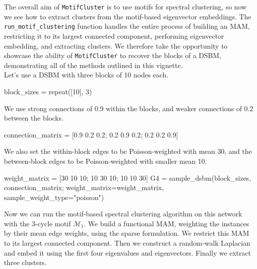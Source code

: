 \documentclass{article}
\begin{document}
The overall aim of \texttt{MotifCluster} is to use motifs for spectral clustering,
so now we see how to extract clusters from the motif-based
eigenvector embeddings.
The \texttt{run\_motif\_clustering} function handles the entire process of
building an MAM, restricting it to its largest connected component,
performing eigenvector embedding, and extracting clusters.
We therefore take the opportunity to showcase the ability of
\texttt{MotifCluster} to recover the blocks of a DSBM,
demonstrating all of the methods outlined in this vignette.\\

Let's use a DSBM with three blocks of 10 nodes each.

\begin{tcolorbox}[colback=black!5!white,colframe=black!15!white]
\begin{juliablock}
block_sizes = repeat([10], 3)
\end{juliablock}
\end{tcolorbox}

We use strong connections of 0.9 within the blocks,
and weaker connections of 0.2 between the blocks.

\begin{tcolorbox}[colback=black!5!white,colframe=black!15!white]
\begin{juliablock}
connection_matrix = [0.9 0.2 0.2; 0.2 0.9 0.2; 0.2 0.2 0.9]
\end{juliablock}
\end{tcolorbox}

We also set the within-block edges to be Poisson-weighted with
mean 30,
and the between-block edges to be Poisson-weighted with smaller
mean 10.

\begin{tcolorbox}[colback=black!5!white,colframe=black!15!white]
\begin{juliablock}
weight_matrix = [30 10 10; 10 30 10; 10 10 30]
G4 = sample_dsbm(block_sizes, connection_matrix;
                 weight_matrix=weight_matrix, sample_weight_type="poisson")
\end{juliablock}
\end{tcolorbox}

Now we can run the motif-based spectral clustering algorithm
on this network with the 3-cycle motif $\mathcal{M}_1$.
We build a functional MAM,
weighting the instances by their mean edge weights,
using the sparse formulation.
We restrict this MAM to its largest connected component.
Then we construct a random-walk Laplacian and embed it using the
first four eigenvalues and eigenvectors.
Finally we extract three clusters.
\end{document}
